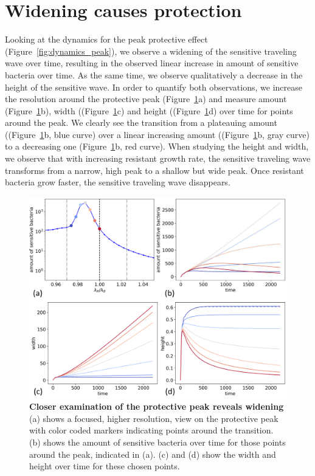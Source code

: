\section{Widening causes protection}
Looking at the dynamics for the peak protective effect (Figure~\ref{fig:dynamics_peak}), we observe a widening of the sensitive traveling wave over time, resulting in the observed linear increase in amount of sensitive bacteria over time. As the same time, we observe qualitatively a decrease in the height of the sensitive wave. In order to quantify both observations, we increase the resolution around the protective peak (Figure~\ref{fig:results_peak_change_height_width}a) and measure amount (Figure~\ref{fig:results_peak_change_height_width}b), width ((Figure~\ref{fig:results_peak_change_height_width}c) and height ((Figure~\ref{fig:results_peak_change_height_width}d) over time for points around the peak. We clearly see the transition from a plateauing amount ((Figure~\ref{fig:results_peak_change_height_width}b, blue curve) over a linear increasing amount ((Figure~\ref{fig:results_peak_change_height_width}b, gray curve) to a decreasing one (Figure~\ref{fig:results_peak_change_height_width}b, red curve). When studying the height and width, we observe that with increasing resistant growth rate, the sensitive traveling wave transforms from a narrow, high peak to a shallow but wide peak. Once resistant bacteria grow faster, the sensitive traveling wave disappears.

\begin{figure}
\centering
\includegraphics[width=\linewidth]{graphics/2025_09_30_phages_fig7.png}
\caption{\textbf{Closer examination of the protective peak reveals widening} (a) shows a focused, higher resolution, view on the protective peak with color coded markers indicating points around the transition. (b) shows the amount of sensitive bacteria over time for those points around the peak, indicated in (a). (c) and (d) show the width and height over time for these chosen points.}
\label{fig:results_peak_change_height_width}
\end{figure}

